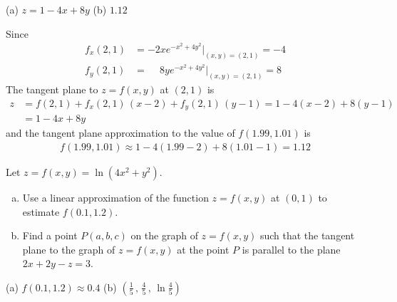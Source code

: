 %

\begin{answer}
(a) $z=1-4x+8y$\qquad
(b) $1.12$
\end{answer}

\begin{solution}
Since
\begin{align*}
f_x(2,1) & = -2x e^{-x^2 +4y^2}\Big|_{(x,y)=(2,1)} = -4 \\
f_y(2,1) & = \phantom{-}8y e^{-x^2 +4y^2}\Big|_{(x,y)=(2,1)} = 8
\end{align*}
The tangent plane to $z=f(x,y)$ at $(2,1)$ is
\begin{align*}
z &= f(2,1) +f_x(2,1)\,(x-2) +f_y(2,1)\,(y-1)
  = 1 -4 (x-2) +8(y-1) \\
 &= 1-4x +8y
\end{align*}
and the tangent plane approximation to the value of $f(1.99, 1.01)$ is
\begin{align*}
f(1.99, 1.01) \approx 1 -4 (1.99-2) +8(1.01-1)
                = 1.12
\end{align*}
\end{solution}

\begin{question}[M200 2012a] %
Let $z = f (x, y) = \ln(4x^2 + y^2)$.
\begin{enumerate}[(a)]
\item
Use a linear approximation of the function $z = f (x, y)$ at $(0, 1)$ to estimate
$f(0.1, 1.2)$.

\item
Find a point $P (a, b, c)$ on the graph of $z = f(x, y)$ such that 
the tangent plane to the graph of $z = f (x, y)$ at the point $P$ is parallel to the plane $2x + 2y - z = 3$.
\end{enumerate}
\end{question}

%

\begin{answer}
(a) $f(0.1,1.2) \approx  0.4$\qquad
(b) $\left(\frac{1}{5}\,,\,\frac{4}{5}\,,\,\ln\frac{4}{5}\right)$
\end{answer}

